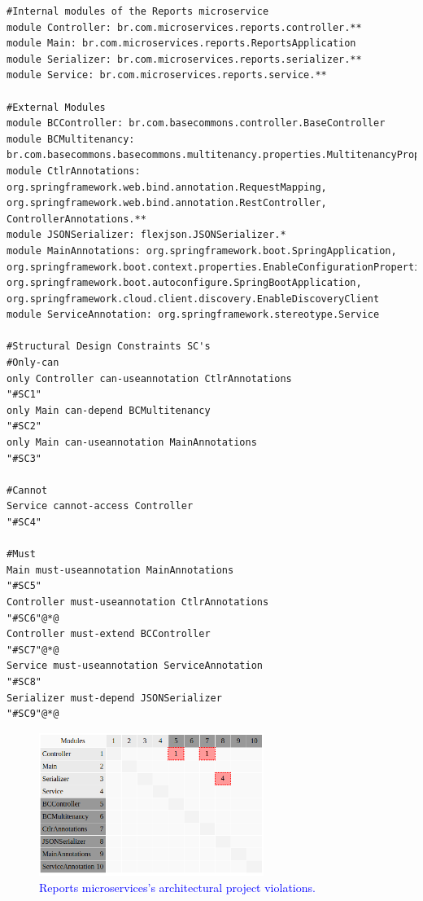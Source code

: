 \documentclass[12pt]{article}
\begin{document}
\begin{lstlisting}[style=colorido,caption={\textcolor{blue}{Reports microservice's architectural project specification.}},label={list:especArquiteturalReports}
]
#Internal modules of the Reports microservice
module Controller: br.com.microservices.reports.controller.**
module Main: br.com.microservices.reports.ReportsApplication
module Serializer: br.com.microservices.reports.serializer.**
module Service: br.com.microservices.reports.service.**

#External Modules
module BCController: br.com.basecommons.controller.BaseController
module BCMultitenancy: br.com.basecommons.basecommons.multitenancy.properties.MultitenancyProperties
module CtlrAnnotations: org.springframework.web.bind.annotation.RequestMapping, org.springframework.web.bind.annotation.RestController, ControllerAnnotations.**
module JSONSerializer: flexjson.JSONSerializer.*
module MainAnnotations: org.springframework.boot.SpringApplication,  org.springframework.boot.context.properties.EnableConfigurationProperties, org.springframework.boot.autoconfigure.SpringBootApplication, org.springframework.cloud.client.discovery.EnableDiscoveryClient
module ServiceAnnotation: org.springframework.stereotype.Service

#Structural Design Constraints SC's
#Only-can
only Controller can-useannotation CtlrAnnotations																																	"#SC1"
only Main can-depend BCMultitenancy																																															"#SC2"
only Main can-useannotation MainAnnotations																																							"#SC3"

#Cannot
Service cannot-access Controller																																																		"#SC4"

#Must	
Main must-useannotation MainAnnotations																																											"#SC5"
Controller must-useannotation CtlrAnnotations																																					"#SC6"@*@
Controller must-extend BCController																																															"#SC7"@*@
Service must-useannotation ServiceAnnotation																																						"#SC8"
Serializer must-depend JSONSerializer																																													"#SC9"@*@

\end{lstlisting}
\begin{figure}[ht]
\centering
\includegraphics[width=0.65\textwidth]{figuras/violacoesReports.png}
\caption{\textcolor{blue}{Reports microservices's architectural project violations.}}
\label{fig:microservices}
\end{figure}
\end{document}
